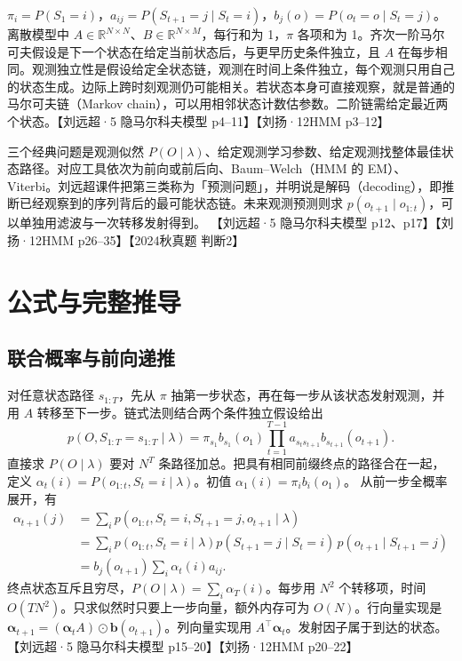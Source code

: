 \documentclass[UTF8,a4paper,zihao=-4,fontset=fandol]{ctexrep}
\begin{document}
$\pi_i=P(S_1=i)$，$a_{ij}=P(S_{t+1}=j\mid S_t=i)$，$b_j(o)=P(o_t=o\mid S_t=j)$。离散模型中 $A\in\mathbb R^{N\times N}$、$B\in\mathbb R^{N\times M}$，每行和为 1，$\pi$ 各项和为 1。齐次一阶马尔可夫假设是下一个状态在给定当前状态后，与更早历史条件独立，且 $A$ 在每步相同。观测独立性是假设给定全状态链，观测在时间上条件独立，每个观测只用自己的状态生成。边际上跨时刻观测仍可能相关。若状态本身可直接观察，就是普通的马尔可夫链（Markov chain），可以用相邻状态计数估参数。二阶链需给定最近两个状态。【刘远超·5 隐马尔科夫模型 p4–11】【刘扬·12HMM p3–12】

三个经典问题是观测似然 $P(O\mid\lambda)$、给定观测学习参数、给定观测找整体最佳状态路径。对应工具依次为前向或前后向、Baum–Welch（HMM 的 EM）、Viterbi。刘远超课件把第三类称为「预测问题」，并明说是解码（decoding），即推断已经观察到的序列背后的最可能状态链。未来观测预测则求 $p(o_{t+1}\mid o_{1:t})$，可以单独用滤波与一次转移发射得到。 【刘远超·5 隐马尔科夫模型 p12、p17】【刘扬·12HMM p26–35】【2024秋真题 判断2】

\section{公式与完整推导}

\subsection{联合概率与前向递推}
对任意状态路径 $s_{1:T}$，先从 $\pi$ 抽第一步状态，再在每一步从该状态发射观测，并用 $A$ 转移至下一步。链式法则结合两个条件独立假设给出
\[
p(O,S_{1:T}=s_{1:T}\mid\lambda)
=\pi_{s_1} b_{s_1}(o_1)\prod_{t=1}^{T-1} a_{s_t s_{t+1}} b_{s_{t+1}}(o_{t+1}).
\]
直接求 $P(O\mid\lambda)$ 要对 $N^T$ 条路径加总。把具有相同前缀终点的路径合在一起，定义
$\alpha_t(i)=P(o_{1:t},S_t=i\mid\lambda)$。初值 $\alpha_1(i)=\pi_i b_i(o_1)$。
从前一步全概率展开，有
\[
\begin{aligned}
\alpha_{t+1}(j)
&=\sum_i p(o_{1:t},S_t=i,S_{t+1}=j,o_{t+1}\mid\lambda)\\
&=\sum_i p(o_{1:t},S_t=i\mid\lambda)
   p(S_{t+1}=j\mid S_t=i)\,p(o_{t+1}\mid S_{t+1}=j)\\
&=b_j(o_{t+1})\sum_i \alpha_t(i)a_{ij}.
\end{aligned}
\]
终点状态互斥且穷尽，$P(O\mid\lambda)=\sum_i\alpha_T(i)$。每步用 $N^2$ 个转移项，时间 $O(TN^2)$。只求似然时只要上一步向量，额外内存可为 $O(N)$。行向量实现是 $\bm\alpha_{t+1}=(\bm\alpha_t A)\odot \bm b(o_{t+1})$。列向量实现用 $A^\top\bm\alpha_t$。发射因子属于到达的状态。 【刘远超·5 隐马尔科夫模型 p15–20】【刘扬·12HMM p20–22】
\end{document}
